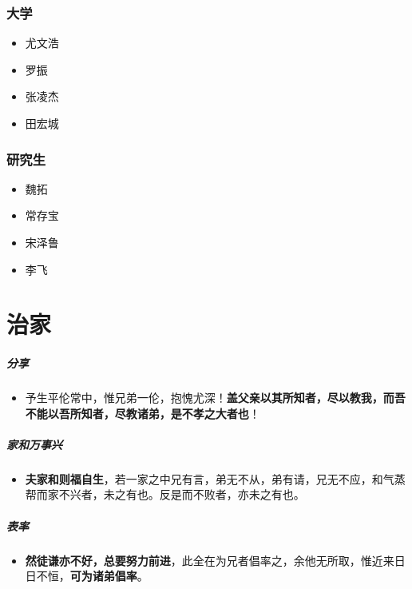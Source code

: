 \documentclass[UTF8,a4paper,8pt]{ctexbook}
\begin{document}
		\subsection{大学}
			\begin{itemize}
				\item  尤文浩
				\item  罗振
				\item  张凌杰
				\item  田宏城
			\end{itemize}
		
		\subsection{研究生}
			\begin{itemize}
				\item  魏拓
				\item  常存宝
				\item  宋泽鲁
				\item  李飞
			\end{itemize}

\chapter{治家}
	\paragraph{分享}
		\begin{itemize}
			\item 予生平伦常中，惟兄弟一伦，抱愧尤深！\textbf{盖父亲以其所知者，尽以教我，而吾不能以吾所知者，尽教诸弟，是不孝之大者也}！
		\end{itemize}

	\paragraph{家和万事兴}
		\begin{itemize}
			\item \textbf{夫家和则福自生}，若一家之中兄有言，弟无不从，弟有请，兄无不应，和气蒸帮而家不兴者，未之有也。反是而不败者，亦未之有也。
		\end{itemize}
		
	\paragraph{表率}
		\begin{itemize}
			\item \textbf{然徒谦亦不好，总要努力前进}，此全在为兄者倡率之，余他无所取，惟近来日日不恒，\textbf{可为诸弟倡率}。
		\end{itemize}
		
\end{document}
